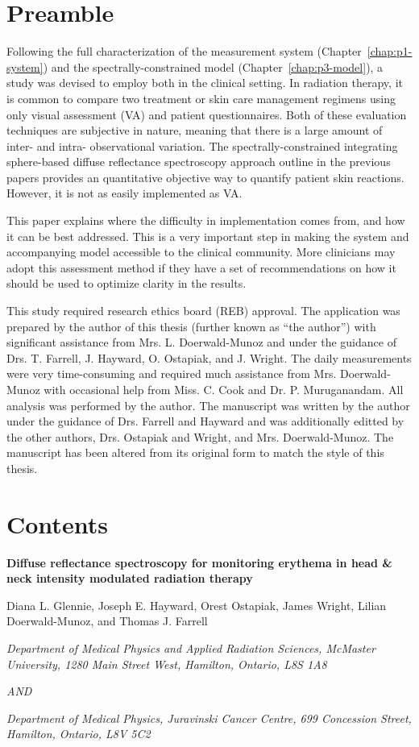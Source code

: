 \label{chap:p4-imrt_study}
\section*{Preamble}
Following the full characterization of the measurement system (Chapter~\ref{chap:p1-system}) and the spectrally-constrained model (Chapter~\ref{chap:p3-model}), a study was devised to employ both in the clinical setting. In radiation therapy, it is common to compare two treatment or skin care management regimens using only visual assessment (VA) and patient questionnaires. Both of these evaluation techniques are subjective in nature, meaning that there is a large amount of inter- and intra- observational variation. The spectrally-constrained integrating sphere-based diffuse reflectance spectroscopy approach outline in the previous papers provides an quantitative objective way to quantify patient skin reactions. However, it is not as easily implemented as VA.

This paper explains where the difficulty in implementation comes from, and how it can be best addressed. This is a very important step in making the system and accompanying model accessible to the clinical community. More clinicians may adopt this assessment method if they have a set of recommendations on how it should be used to optimize clarity in the results.

This study required research ethics board (REB) approval. The application was prepared by the author of this thesis (further known as ``the author'') with significant assistance from Mrs. L. Doerwald-Munoz and under the guidance of Drs. T. Farrell, J. Hayward, O. Ostapiak, and J. Wright. The daily measurements were very time-consuming and required much assistance from Mrs. Doerwald-Munoz with occasional help from Miss. C. Cook and Dr. P. Muruganandam. All analysis was performed by the author. The manuscript was written by the author under the guidance of Drs. Farrell and Hayward and was additionally editted by the other authors, Drs. Ostapiak and Wright, and Mrs. Doerwald-Munoz. The manuscript has been altered from its original form to match the style of this thesis.

\section*{Contents}

\begin{center}
	
	\textbf{Diffuse reflectance spectroscopy for monitoring erythema in head \& neck intensity modulated radiation therapy}
	
	Diana L. Glennie, Joseph E. Hayward, Orest Ostapiak, James Wright, Lilian Doerwald-Munoz, and Thomas J. Farrell
	
	\textit{Department of Medical Physics and Applied Radiation Sciences, McMaster University, 1280 Main Street West, Hamilton, Ontario, L8S 1A8}
	
	\textit{AND}
	
	\textit{Department of Medical Physics, Juravinski Cancer Centre, 699 Concession Street, Hamilton, Ontario, L8V 5C2}
	
\end{center}

